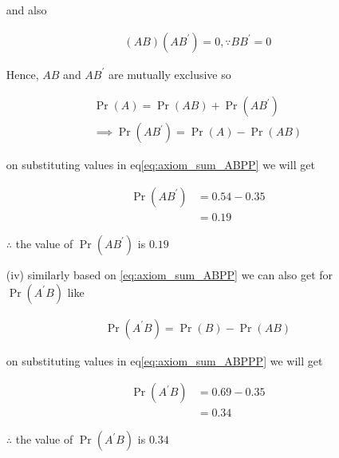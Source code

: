 \documentclass[journal,12pt,twocolumn]{IEEEtran}
\providecommand{\brak}[1]{\ensuremath{\left(#1\right)}}
\providecommand{\pr}[1]{\ensuremath{\Pr\left(#1\right)}}
\begin{document}
\begin{enumerate}
            and also
    
            \begin{align}
                  \brak{ AB}\brak{  AB^{\prime}} = 0, \because BB^{\prime} = 0
                  \label{eq:axiom_sum_ABP}
            \end{align}
                  
            Hence, $AB$ and $AB^{\prime}$ are mutually exclusive so 
    
            \begin{align}
                     \pr{A} = \pr{AB} + \pr{AB^{\prime}} \\
                  \implies 
                     \pr{A B^{\prime}} =  \pr{A} - \pr{AB}
                     \label{eq:axiom_sum_ABPP}
            \end{align}
    
            on substituting values in eq\eqref{eq:axiom_sum_ABPP} we will get
            
            \begin{align}
                     \pr{A B^{\prime}} &= 0.54 - 0.35 \\
                                       &= 0.19
            \end{align}
            
            $\therefore$ the value of $\pr{A B^{\prime}}$ is $0.19$
            
            
            
    \item[(iv)] similarly based on \eqref{eq:axiom_sum_ABPP} we can also get for $\pr{A^{\prime} B}$ like 
    
            \begin{align}
                   \pr{A^{\prime} B} =  \pr{B} - \pr{AB}
                   \label{eq:axiom_sum_ABPPP}
            \end{align}
            
            on substituting values in eq\eqref{eq:axiom_sum_ABPPP} we will get

            \begin{align}
                     \pr{A^{\prime} B} &= 0.69 - 0.35 \\
                                       &= 0.34
            \end{align}
            
            $\therefore$ the value of $\pr{A^{\prime} B}$ is $0.34$
            
            
    
\end{enumerate}
\end{document}
